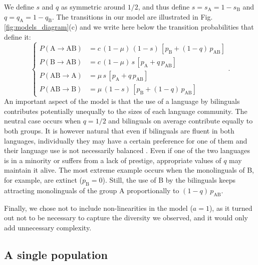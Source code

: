 \documentclass[../thesis.tex]{subfiles}
\begin{document}
We define $s$ and $q$ as symmetric around $1/2$, and thus define $s = s_\text{A} = 1 -
s_\text{B}$ and $q = q_\text{A} = 1 - q_\text{B}$. The transitions in our model are
illustrated in Fig. \ref{fig:models_diagram}(c) and we write here below the
transition probabilities that define it:
\begin{equation}
\label{eq:bipref_model}
\left\{
\begin{aligned}
    P (\text{A} \rightarrow \text{AB}) &= c \, (1 - \mu) \, (1-s) \, \left[ p_{\text{B}} + (1-q) \,  p_{\text{AB}} \right] \\
    P (\text{B} \rightarrow \text{AB}) &= c \, (1 - \mu) \, s \, \left[ p_{\text{A}} + q \, p_{\text{AB}} \right] \\
    P (\text{AB} \rightarrow \text{A}) &= \mu \, s \, \left[ p_{\text{A}} + q \, p_{\text{AB}} \right] \\
    P (\text{AB} \rightarrow \text{B}) &= \mu \, (1-s) \, \left[ p_{\text{B}} + (1-q) \, p_{\text{AB}} \right]
\end{aligned}
\right. .
\end{equation}
An important aspect of the model is that the use of a language by bilinguals contributes
potentially unequally to the sizes of each language community. The neutral case occurs
when $q = 1/2$ and bilinguals on average contribute equally to both groups. It is
however natural that even if bilinguals are fluent in both languages, individually they
may have a certain preference for one of them and their language use is not necessarily
balanced \cite{RomaineBilingualMultilingual2012}. Even if one of the two languages is in
a minority or suffers from a lack of prestige, appropriate values of $q$ may maintain it
alive. The most extreme example occurs when the monolinguals of B, for example, are
extinct ($p_{\text{B}} = 0$). Still, the use of B by the bilinguals keeps attracting
monolinguals of the group A proportionally to $(1-q)\, p_{\text{AB}}$.

Finally, we chose not to include non-linearities in the model ($a = 1$), as it turned out
not to be necessary to capture the diversity we observed, and it would only add
unnecessary complexity.


\subsection{A single population}
\end{document}
